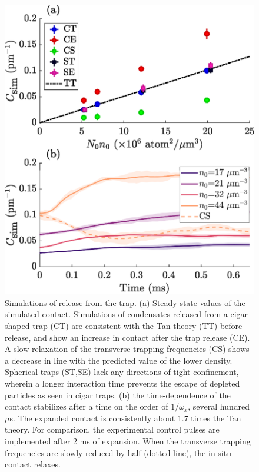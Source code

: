 	\begin{figure}
	        \includegraphics[width=\columnwidth]{fig/QD/sim_results.eps}
	        \caption{Simulations of release from the trap. (a) Steady-state values of the simulated contact. Simulations of condensates released from a cigar-shaped trap (CT) are consistent with the Tan theory (TT) before release, and show an increase in contact after the trap release (CE). A slow relaxation of the transverse trapping frequencies (CS) shows a decrease in line with the predicted value of the lower density. Spherical traps (ST,SE) lack any directions of tight confinement, wherein a longer interaction time prevents the escape of depleted particles as seen in cigar traps. (b) the time-dependence of the contact stabilizes after a time on the order of $1/\omega_x$, several hundred $\mu$s. The expanded contact is consistently about 1.7 times the Tan theory. For comparison, the experimental control pulses are implemented after 2 ms of expansion. When the transverse trapping frequencies are slowly reduced by half (dotted line), the in-situ contact relaxes.}
	        \label{fig:sim_fig}
	\end{figure}
	
